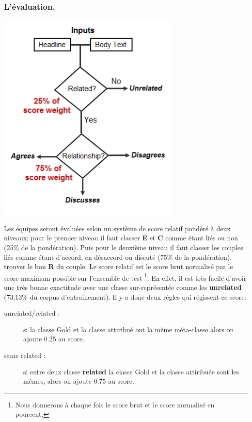 \documentclass[11pt,a4paper,oldfontcommands]{memoir}
\begin{document}
\subsubsection{L'évaluation.}
\begin{center}
 \includegraphics[scale=0.5]{../../img/fnc-eval/fnc-eval.png}
 \label{fig_eval}
\end{center}

Les équipes seront évaluées selon un système de score relatif pondéré à deux niveaux; pour le premier niveau il faut classer \textbf{E} et \textbf{C} comme étant liés ou non (25\% de la pondération).
Puis pour le deuxième niveau il faut classer les couples liés comme étant d'accord, en désaccord ou discuté (75\% de la pondération), trouver le bon \textbf{R} du couple.
Le score relatif est le score brut normalisé par le score maximum possible sur l'ensemble de test \footnote{Nous donnerons à chaque fois le score brut et le score normalisé en pourcent.}.
En effet, il est très facile d'avoir une très bonne exactitude avec une classe sur-représentée comme les \textbf{unrelated} (73.13\% du corpus d'entrainement).
Il y a donc deux règles qui régissent ce score:
\begin{description}
 \item [unrelated/related :] si la classe Gold et la classe attiribué ont la même méta-classe alors on ajoute 0.25 au score.
 \item [same related :] si entre deux classe \textbf{related} la classe Gold et la classe attiribuée sont les mêmes, alors on ajoute 0.75 au score.
\end{description}
\end{document}
